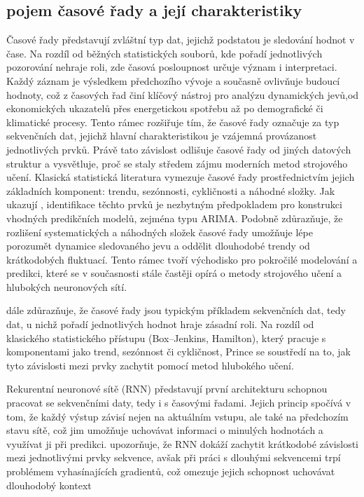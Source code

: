 \subsection{pojem časové řady a její charakteristiky}
Časové řady představují zvláštní typ dat, jejichž podstatou je sledování hodnot v čase. Na rozdíl 
od běžných statistických souborů, kde pořadí jednotlivých pozorování nehraje roli, zde časová posloupnost určuje význam i interpretaci. Každý záznam je výsledkem předchozího vývoje a současně ovlivňuje budoucí hodnoty, což z časových řad činí klíčový nástroj pro analýzu dynamických jevů,od ekonomických ukazatelů přes energetickou spotřebu až po demografické či klimatické procesy. 
 \cite{Prince2023} Tento rámec rozšiřuje tím, že časové řady označuje za typ sekvenčních dat, jejichž hlavní charakteristikou je vzájemná provázanost jednotlivých prvků. Právě tato závislost odlišuje časové řady od jiných datových struktur a vysvětluje, proč se staly středem zájmu moderních metod strojového učení.
Klasická statistická literatura vymezuje časové řady prostřednictvím jejich základních komponent: trendu, sezónnosti, cykličnosti a náhodné složky. Jak ukazují \cite{BoxJenkins1976}, identifikace těchto prvků je nezbytným předpokladem pro konstrukci vhodných predikčních modelů, zejména typu ARIMA. 
Podobně \cite{Hamilton1994} zdůrazňuje, že rozlišení systematických a náhodných složek časové řady umožňuje lépe porozumět dynamice sledovaného jevu a oddělit dlouhodobé trendy od krátkodobých fluktuací. Tento rámec tvoří východisko pro pokročilé modelování a predikci, které se v současnosti stále častěji opírá o metody strojového učení a hlubokých neuronových sítí.

\cite{Prince2023} dále zdůrazňuje, že časové řady jsou typickým příkladem sekvenčních dat, tedy dat, 
u nichž pořadí jednotlivých hodnot hraje zásadní roli. Na rozdíl od klasického statistického přístupu (Box–Jenkins, Hamilton), který pracuje s komponentami jako trend, sezónnost či cykličnost, Prince se soustředí na to, jak tyto závislosti mezi prvky zachytit pomocí metod hlubokého učení.



Rekurentní neuronové sítě (RNN) představují první architekturu schopnou pracovat se sekvenčními daty, tedy i s časovými řadami. Jejich princip spočívá v tom, že každý výstup závisí nejen na aktuálním vstupu, 
ale také na předchozím stavu sítě, což jim umožňuje uchovávat informaci o minulých hodnotách a využívat ji při predikci. \cite{prince 2023} upozorňuje, že RNN dokáží zachytit krátkodobé závislosti mezi jednotlivými prvky sekvence, avšak při práci s dlouhými sekvencemi trpí problémem vyhasínajících gradientů, což omezuje jejich schopnost uchovávat dlouhodobý kontext

